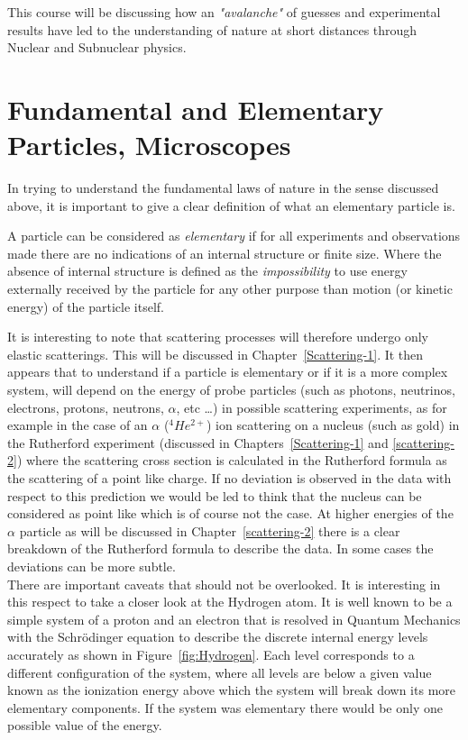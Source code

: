This course will be discussing how an {\it "avalanche"} of guesses and experimental results have led to the understanding of nature at short distances through Nuclear and Subnuclear physics. \\


\section{Fundamental and Elementary Particles, Microscopes}

In trying to understand the fundamental laws of nature in the sense discussed above, it is important to give a clear definition of what an elementary particle is.

\begin{definition}

A particle can be considered as {\it elementary} if for all experiments and observations made there are no indications of an internal structure or finite size.
Where the absence of internal structure is defined as the {\it impossibility} to use energy externally received by the particle for any other purpose than motion (or kinetic energy) of the particle itself.

\end{definition}

It is interesting to note that scattering processes will therefore undergo only elastic scatterings. This will be discussed in Chapter~\ref{Scattering-1}. It then appears that to understand if a particle is elementary or if it is a more complex system, will depend on the energy of probe particles (such as photons, neutrinos, electrons, protons, neutrons, $\alpha$, etc \dots) in possible scattering experiments, as for example in the case of an $\alpha$ ($^4He^{2+}$) ion scattering on a nucleus (such as gold) in the Rutherford experiment (discussed in Chapters~\ref{Scattering-1} and \ref{scattering-2}) where the scattering cross section is calculated in the Rutherford formula as the scattering of a point like charge. If no deviation is observed in the data with respect to this prediction we would be led to think that the nucleus can be considered as point like which is of course not the case. At higher energies of the $\alpha$ particle as will be discussed in Chapter~\ref{scattering-2} there is a clear breakdown of the Rutherford formula to describe the data. In some cases the deviations can be more subtle. \\

There are important caveats that should not be overlooked. It is interesting in this respect to take a closer look at the Hydrogen atom. It is well known to be a simple system of a proton and an electron that is resolved in Quantum Mechanics with the Schr\"odinger equation to describe the discrete internal energy levels accurately as shown in Figure~\ref{fig:Hydrogen}. Each level corresponds to a different configuration of the system, where all levels are below a given value known as the ionization energy above which the system will break down its more elementary components. If the system was elementary there would be only one possible value of the energy. 

